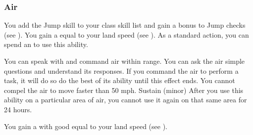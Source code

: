         \subsubsection{Air}
             You add the Jump skill to your class skill list and gain a  bonus to Jump checks (see ).
             You gain a  equal to your land speed (see ).
             As a standard action, you can spend an  to use this ability.
            \begin{ability}
                \begin{spelltargetinginfo}
                    \spellrng{\rnglong}
                \end{spelltargetinginfo}
                \begin{spelleffects}
                    \spelleffect You can speak with and command air within range.
                    You can ask the air simple questions and understand its responses.
                    If you command the air to perform a task, it will do so do the best of its ability until this effect ends.
                    You cannot compel the air to move faster than 50 mph.
                    \spelldur Sustain (minor)
                    \spellspecial After you use this ability on a particular area of air, you cannot use it again on that same area for 24 hours.
                \end{spelleffects}
            \end{ability}
             You gain a  with good  equal to your land speed (see ).

